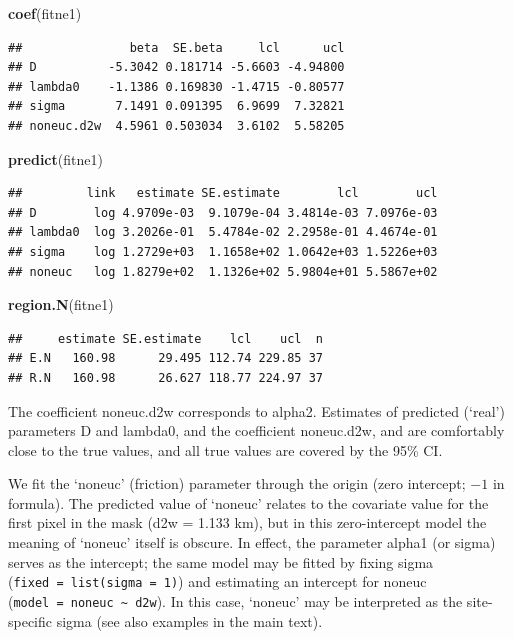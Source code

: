 \documentclass[
]{book}
\newenvironment{Shaded}{\begin{snugshade}}{\end{snugshade}}
\newcommand{\FunctionTok}[1]{\textcolor[rgb]{0.13,0.29,0.53}{\textbf{#1}}}
\newcommand{\NormalTok}[1]{#1}
\begin{document}
\begin{Shaded}
\begin{Highlighting}[]
\FunctionTok{coef}\NormalTok{(fitne1)}
\end{Highlighting}
\end{Shaded}

\begin{verbatim}
##               beta  SE.beta     lcl      ucl
## D          -5.3042 0.181714 -5.6603 -4.94800
## lambda0    -1.1386 0.169830 -1.4715 -0.80577
## sigma       7.1491 0.091395  6.9699  7.32821
## noneuc.d2w  4.5961 0.503034  3.6102  5.58205
\end{verbatim}

\begin{Shaded}
\begin{Highlighting}[]
\FunctionTok{predict}\NormalTok{(fitne1)}
\end{Highlighting}
\end{Shaded}

\begin{verbatim}
##         link   estimate SE.estimate        lcl        ucl
## D        log 4.9709e-03  9.1079e-04 3.4814e-03 7.0976e-03
## lambda0  log 3.2026e-01  5.4784e-02 2.2958e-01 4.4674e-01
## sigma    log 1.2729e+03  1.1658e+02 1.0642e+03 1.5226e+03
## noneuc   log 1.8279e+02  1.1326e+02 5.9804e+01 5.5867e+02
\end{verbatim}

\begin{Shaded}
\begin{Highlighting}[]
\FunctionTok{region.N}\NormalTok{(fitne1)}
\end{Highlighting}
\end{Shaded}

\begin{verbatim}
##     estimate SE.estimate    lcl    ucl  n
## E.N   160.98      29.495 112.74 229.85 37
## R.N   160.98      26.627 118.77 224.97 37
\end{verbatim}

The coefficient noneuc.d2w corresponds to alpha2. Estimates of predicted (`real') parameters D and lambda0, and the coefficient noneuc.d2w, and are comfortably close to the true values, and all true values are covered by the 95\% CI.

We fit the `noneuc' (friction) parameter through the origin (zero intercept; \(-1\) in formula). The predicted value of `noneuc' relates to the covariate value for the first pixel in the mask (d2w = 1.133 km), but in this zero-intercept model the meaning of `noneuc' itself is obscure. In effect, the parameter alpha1 (or sigma) serves as the intercept; the same model may be fitted by fixing sigma (\texttt{fixed\ =\ list(sigma\ =\ 1)}) and estimating an intercept for noneuc (\texttt{model\ =\ noneuc\ \textasciitilde{}\ d2w}). In this case, `noneuc' may be interpreted as the site-specific sigma (see also examples in the main text).
\end{document}
